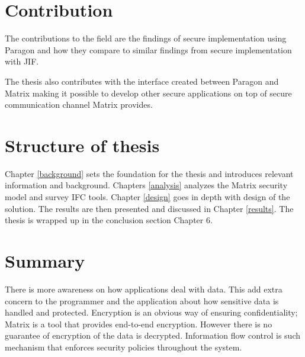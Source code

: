  
 
 
\section{Contribution} %

The contributions to the field are the findings of secure implementation using Paragon and how they compare to similar findings from secure implementation with JIF.

The thesis also contributes with the interface created between Paragon and Matrix making it possible to develop other secure applications on top of secure communication channel Matrix provides. 

 
 
\section{Structure of thesis} %

Chapter \ref{background} sets the foundation for the thesis and introduces relevant information and background. Chapters \ref{analysis} analyzes the Matrix security model and survey IFC tools. Chapter \ref{design} goes in depth with design of the solution. The results are then presented and discussed in Chapter \ref{results}. The thesis is wrapped up in the conclusion section Chapter 6. 
 
\section{Summary}
There is more awareness on how applications deal with data. This add extra concern to the programmer and the application about how sensitive data is handled and protected. Encryption is an obvious way of ensuring confidentiality; Matrix is a tool that provides end-to-end encryption. However there is no guarantee of encryption of the data is decrypted. Information flow control is such mechanism that enforces security policies throughout the system.


